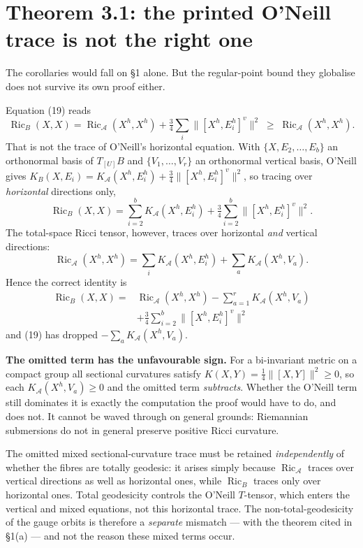\documentclass[11pt]{article}
\newcommand{\A}{\mathcal A}
\begin{document}
\section{Theorem 3.1: the printed O'Neill trace is not the right one}

The corollaries would fall on \S1 alone. But the regular-point bound they globalise
does not survive its own proof either.

Equation (19) reads
\[
\operatorname{Ric}_B(X,X)
=\operatorname{Ric}_{\A}(X^h,X^h)
+\tfrac34\sum_i\bigl\|[X^h,E_i^h]^v\bigr\|^2
\;\ge\;\operatorname{Ric}_{\A}(X^h,X^h).
\]
That is not the trace of O'Neill's horizontal equation. With $\{X,E_2,\dots,E_b\}$ an
orthonormal basis of $T_{[U]}B$ and $\{V_1,\dots,V_r\}$ an orthonormal vertical basis,
O'Neill gives $K_B(X,E_i)=K_{\A}(X^h,E_i^h)+\frac34\|[X^h,E_i^h]^v\|^2$, so tracing
over \emph{horizontal} directions only,
\[
\operatorname{Ric}_B(X,X)=\sum_{i=2}^{b}K_{\A}(X^h,E_i^h)
+\tfrac34\sum_{i=2}^{b}\bigl\|[X^h,E_i^h]^v\bigr\|^2 .
\]
The total-space Ricci tensor, however, traces over horizontal \emph{and} vertical
directions:
\[
\operatorname{Ric}_{\A}(X^h,X^h)
=\sum_{i}K_{\A}(X^h,E_i^h)+\sum_{a}K_{\A}(X^h,V_a).
\]
Hence the correct identity is
\[
\boxed{\begin{aligned}
\operatorname{Ric}_B(X,X)={}&\operatorname{Ric}_{\A}(X^h,X^h)
-\sum_{a=1}^{r}K_{\A}(X^h,V_a)\\
&+\tfrac34\sum_{i=2}^{b}\bigl\|[X^h,E_i^h]^v\bigr\|^2
\end{aligned}}
\]
and (19) has dropped $-\sum_a K_{\A}(X^h,V_a)$.

\textbf{The omitted term has the unfavourable sign.} For a bi-invariant metric on a
compact group all sectional curvatures satisfy $K(X,Y)=\frac14\|[X,Y]\|^2\ge0$, so each
$K_{\A}(X^h,V_a)\ge0$ and the omitted term \emph{subtracts}. Whether the O'Neill term
still dominates it is exactly the computation the proof would have to do, and does not.
It cannot be waved through on general grounds: Riemannian submersions do not in general
preserve positive Ricci curvature.

The omitted mixed sectional-curvature trace must be retained \emph{independently} of
whether the fibres are totally geodesic: it arises simply because
$\operatorname{Ric}_{\A}$ traces over vertical directions as well as horizontal ones,
while $\operatorname{Ric}_B$ traces only over horizontal ones. Total geodesicity
controls the O'Neill $T$-tensor, which enters the vertical and mixed equations, not
this horizontal trace. The non-total-geodesicity of the gauge orbits is therefore a
\emph{separate} mismatch --- with the theorem cited in \S1(a) --- and not the reason
these mixed terms occur.
\end{document}
